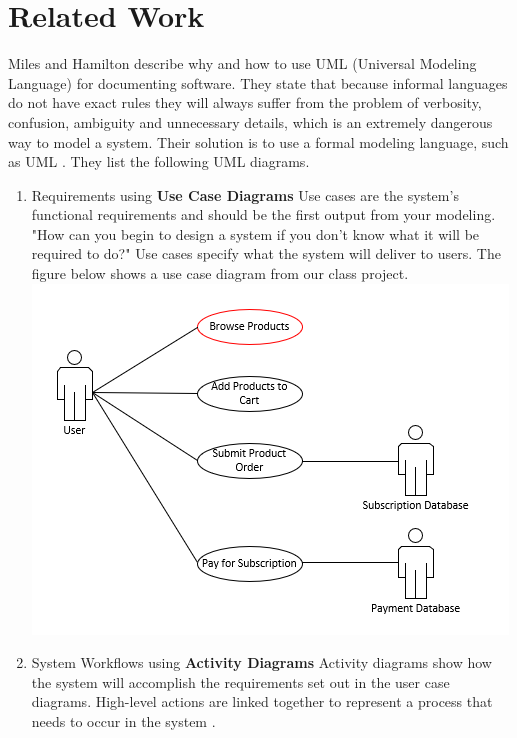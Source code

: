 \documentclass{acm_proc_article-sp}
\begin{document}
\section{Related Work}
Miles and Hamilton describe why and how to use UML (Universal Modeling Language) for documenting software. They state that because informal languages do not have exact rules they will always suffer from the problem of verbosity, confusion, ambiguity and unnecessary details, which is an extremely dangerous way to model a system. Their solution is to use a formal modeling language, such as UML \cite{Lamport:UML}.
\newline
They list the following UML diagrams\cite{Lamport:UML}.
\begin{enumerate}
	\item Requirements using \textbf{Use Case Diagrams}
	\newline
	Use cases are the system's functional requirements and should be the first output from your modeling. "How can you begin to design a system if you don't know what it will be required to do?" \cite{Lamport:UML} Use cases specify what the system will deliver to users.
	\newline
	The figure below shows a use case diagram from our class project.
	\newline
	\includegraphics[scale=0.5]{UseCaseDiagrams}
	\item System Workflows using \textbf{Activity Diagrams}
	\newline
	Activity diagrams show how the system will accomplish the requirements set out in the user case diagrams. High-level actions are linked together to represent a process that needs to occur in the system \cite{Lamport:UML}.

\end{enumerate}
\end{document}
